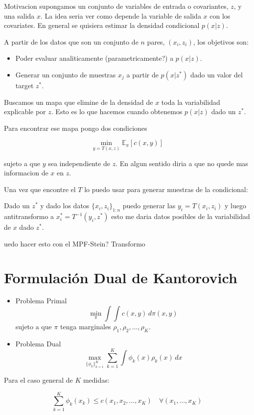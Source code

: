 \documentclass{myarticle}
\begin{document}
Motivacion supongamos un conjunto de variables de entrada o covariantes, $z$, y una salida $x$. La idea seria ver como depende la variable de salida $x$ con los covariates. En general se quisiera estimar la densidad condicional $p(x|z)$.

A partir de los datos que son un conjunto de $n$ pares, $(x_i,z_i)$, los objetivos son:

\begin{itemize}
\item Poder evaluar analiticamente (parametricamente?) a $p(x|z)$.
\item Generar un conjunto de muestras ${x_j}$ a partir de $p(x|z^*)$ dado un valor del target $z^*$.
\end{itemize}

Buscamos un mapa que elimine de la densidad de $x$ toda la variabilidad explicable por $z$. Esto es lo que hacemos cuando obtenemos $p(x|z)$ dado un $z^*$.

Para encontrar ese mapa pongo dos condiciones

\[\min_{y=T(x,z)} \mathbb E_\pi [ c(x,y) ] \]

sujeto a que $y$ sea independiente de $z$. En algun sentido diria a que no quede mas informacion de $x$ en $z$.

Una vez que encontre el $T$ lo puedo usar para generar muestras de la condicional:

Dado un $z^*$ y dado los datos $\{x_i,z_i\}_{1:n}$ puedo generar las $y_i=T(x_i,z_i)$ y luego antitransformo a $x^*_i=T^{-1}(y_i,z^*)$ esto me daria datos posibles de la variabilidad de $x$ dado $z^*$.

uedo hacer esto con el MPF-Stein? Transformo
 

\section{Formulación Dual de Kantorovich}

\begin{itemize}
\item Problema Primal
\[\min_{\pi} \int \int c(x,y) \, d\pi(x,y) \]
sujeto a que $\pi$ tenga marginales $\rho_1, \rho_2, \ldots, \rho_K$.
\item Problema Dual
\[\max_{\{\phi_k\}_{k=1}^K} \sum_{k=1}^K \int \phi_k(x) \rho_k(x) \, dx \]
\end{itemize}

Para el caso general de $K$ medidas:

\[\sum_{k=1}^K \phi_k(x_k) \leq c(x_1, x_2, \ldots, x_K) \quad \forall (x_1, \ldots, x_K) \]
\end{document}
